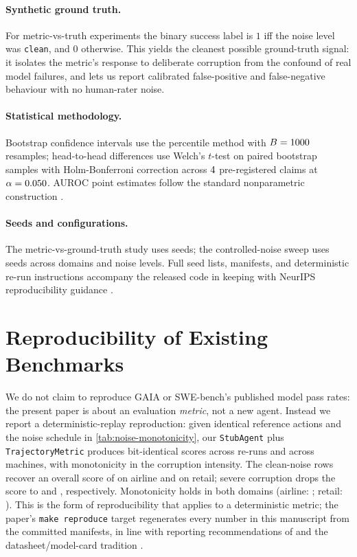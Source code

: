 \documentclass{article}
\begin{document}
\paragraph{Synthetic ground truth.} For metric-vs-truth experiments
the binary success label is $1$ iff the noise level was
\texttt{clean}, and $0$ otherwise. This yields the cleanest possible
ground-truth signal: it isolates the metric's response to deliberate
corruption from the confound of real model failures, and lets us
report calibrated false-positive and false-negative behaviour with no
human-rater noise.

\paragraph{Statistical methodology.} Bootstrap confidence intervals
\citep{efron1993bootstrap} use the percentile method with $B=1000{}$
resamples; head-to-head differences use Welch's $t$-test
\citep{welch1947generalization} on paired bootstrap samples with
Holm-Bonferroni correction \citep{holm1979multiple} across $4{}$
pre-registered claims at $\alpha=0.050{}$. AUROC point estimates
follow the standard nonparametric construction
\citep{delong1988roc}.

\paragraph{Seeds and configurations.} The metric-vs-ground-truth study
uses \TruthSeedsCount{} seeds; the controlled-noise sweep uses
\NoiseSeedsCount{} seeds across \NoiseDomainsCount{} domains and
\NoiseLevelsCount{} noise levels. Full seed lists, manifests, and
deterministic re-run instructions accompany the released code in
keeping with NeurIPS reproducibility guidance
\citep{pineau2021reproducibility}.

\section{Reproducibility of Existing Benchmarks}
\label{sec:reproducibility}

We do not claim to reproduce GAIA or SWE-bench's published model pass
rates: the present paper is about an evaluation \emph{metric}, not a
new agent. Instead we report a deterministic-replay reproduction:
given identical reference actions and the noise schedule in
\autoref{tab:noise-monotonicity}, our \texttt{StubAgent} plus
\texttt{TrajectoryMetric} produces bit-identical scores across
re-runs and across machines, with monotonicity in the corruption
intensity. The clean-noise rows recover an overall score of
\NoiseCleanAirlineMean{} on airline and \NoiseCleanRetailMean{} on
retail; severe corruption drops the score to \NoiseSevereAirlineMean{}
and \NoiseSevereRetailMean{}, respectively. Monotonicity holds in
both domains (airline: \MonotonicityAirline{}; retail:
\MonotonicityRetail{}). This is the form of reproducibility that
applies to a deterministic metric; the paper's
\texttt{make reproduce} target regenerates every number in this
manuscript from the committed manifests, in line with reporting
recommendations of \citet{pineau2021reproducibility} and the
datasheet/model-card tradition \citep{gebru2021datasheets,
mitchell2019modelcards}.
\end{document}
